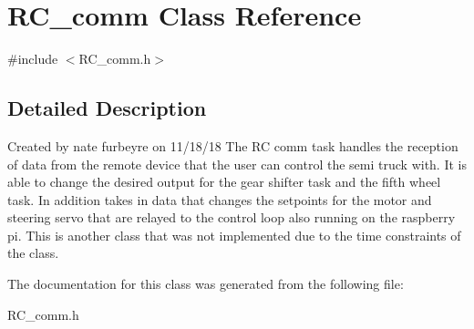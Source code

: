 \hypertarget{classRC__comm}{}\section{R\+C\+\_\+comm Class Reference}
\label{classRC__comm}


{\ttfamily \#include $<$R\+C\+\_\+comm.\+h$>$}



\subsection{Detailed Description}
Created by nate furbeyre on 11/18/18 The RC comm task handles the reception of data from the remote device that the user can control the semi truck with. It is able to change the desired output for the gear shifter task and the fifth wheel task. In addition takes in data that changes the setpoints for the motor and steering servo that are relayed to the control loop also running on the raspberry pi. This is another class that was not implemented due to the time constraints of the class. 

The documentation for this class was generated from the following file\+:\begin{DoxyCompactItemize}
\item 
R\+C\+\_\+comm.\+h\end{DoxyCompactItemize}
